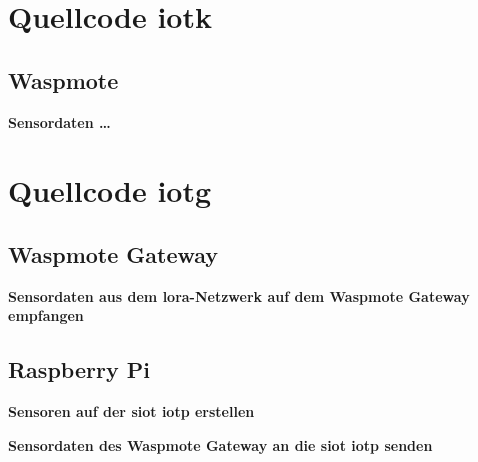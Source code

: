 \chapter{Quellcode \gls{iotk}}

\section{Waspmote}\label{appendix:waspmote}

\textbf{Sensordaten \dots}



\chapter{Quellcode \gls{iotg}}

\section{Waspmote Gateway}\label{appendix:waspmote-gateway}

\textbf{Sensordaten aus dem \gls{lora}-Netzwerk auf dem Waspmote Gateway empfangen}


\section{Raspberry Pi}\label{appendix:raspberrypi}

\textbf{Sensoren auf der \gls{siot} \gls{iotp} erstellen}


\textbf{Sensordaten des Waspmote Gateway an die \gls{siot} \gls{iotp} senden}

